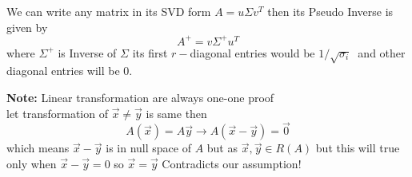 \documentclass[a4paper,11pt]{article}
\numberwithin{equation}{section}
\begin{document}
\begin{itemize}
\begin{itemize}
        We can write any matrix in its SVD form $A=u\Sigma v^T$ then its Pseudo Inverse is given by
        \[\boxed{A^{+}=v\Sigma^{+}u^T}\]
        where $\Sigma^+$ is Inverse of $\Sigma$ its first $r-$diagonal entries would be $1/\sqrt{\sigma_i} \hspace{3pt}$ and other diagonal entries will be 0.
    \end{itemize}




\textbf{Note: }Linear transformation are always one-one proof\\

let transformation of $\vec{x}\neq \vec{y}$ is same then
\[A(\vec{x})=A{\vec{y}} \longrightarrow A(\vec{x}-\vec{y})=\vec{0}\]
which means $\vec{x}-\vec{y}$ is in null space of $A$ but as $\vec{x},\vec{y}\in R(A)$ but this will true only when $\vec{x}-\vec{y}=0$ so $\vec{x}=\vec{y}$ Contradicts our assumption!
    \end{itemize}
\end{document}
